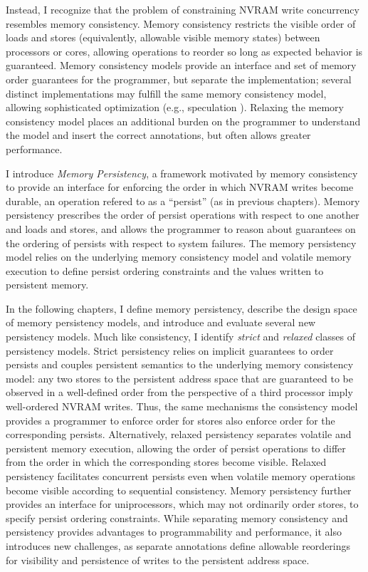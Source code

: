 Instead, I recognize that the problem of constraining NVRAM write concurrency resembles memory consistency.
Memory consistency restricts the visible order of loads and stores (equivalently, allowable visible memory states) between processors or cores, allowing operations to reorder so long as expected behavior is guaranteed.
Memory consistency models provide an interface and set of memory order guarantees for the programmer, but separate the implementation; several distinct implementations may fulfill the same memory consistency model, allowing sophisticated optimization (e.g., speculation \cite{Blundell09,Wenisch07,Ceze07,Gniady99,Ranganathan97}).
Relaxing the memory consistency model places an additional burden on the programmer to understand the model and insert the correct annotations, but often allows greater performance.

I introduce \emph{Memory Persistency}, a framework motivated by memory consistency to provide an interface for enforcing the order in which NVRAM writes become durable, an operation refered to as a ``persist'' (as in previous chapters).
Memory persistency prescribes the order of persist operations with respect to one another and loads and stores, and allows the programmer to reason about guarantees on the ordering of persists with respect to system failures.
The memory persistency model relies on the underlying memory consistency model and volatile memory execution to define persist ordering constraints and the values written to persistent memory.

In the following chapters, I define memory persistency, describe the design space of memory persistency models, and introduce and evaluate several new persistency models.
Much like consistency, I identify \emph{strict} and \emph{relaxed} classes of persistency models.
Strict persistency relies on implicit guarantees to order persists and couples persistent semantics to the underlying memory consistency model: any two stores to the persistent address space that are guaranteed to be observed in a well-defined order from the perspective of a third processor imply well-ordered NVRAM writes.
Thus, the same mechanisms the consistency model provides a programmer to enforce order for stores also enforce order for the corresponding persists. 
Alternatively, relaxed persistency separates volatile and persistent memory execution, allowing the order of persist operations to differ from the order in which the corresponding stores become visible.
Relaxed persistency facilitates concurrent persists even when volatile memory operations become visible according to sequential consistency.
Memory persistency further provides an interface for uniprocessors, which may not ordinarily order stores, to specify persist ordering constraints.
While separating memory consistency and persistency provides advantages to programmability and performance, it also introduces new challenges, as separate annotations define allowable reorderings for visibility and persistence of writes to the persistent address space.

